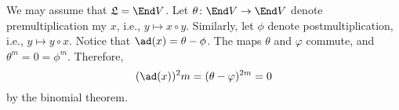 We may assume that $\mathfrak{L} = \End V$. Let
$\theta\colon \End V\to \End V$ denote premultiplication my  $x$,
i.e., $y\mapsto x \circ y$. Similarly, let $\phi$ denote
postmultiplication, i.e., $y\mapsto y \circ x$. Notice that
$\ad(x) = \theta - \phi$. The maps $\theta$ and $\varphi$ commute, and
$\theta^m = 0 = \phi^m$. Therefore,
\[ (\ad(x))^2m = (\theta - \varphi)^{2m} = 0 \]
by the binomial theorem.
